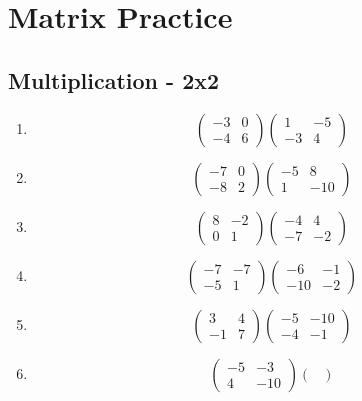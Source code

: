 \documentclass{article}%
\begin{document}
%
\normalsize%
\section{Matrix Practice}%
\subsection{Multiplication {-} 2x2}%
\begin{enumerate}[label=\arabic*)]%
\item%
\[%
\begin{pmatrix}%
-3&0\\%
-4&6%
\end{pmatrix} \begin{pmatrix}%
1&-5\\%
-3&4%
\end{pmatrix}%
\]%
\item%
\[%
\begin{pmatrix}%
-7&0\\%
-8&2%
\end{pmatrix} \begin{pmatrix}%
-5&8\\%
1&-10%
\end{pmatrix}%
\]%
\item%
\[%
\begin{pmatrix}%
8&-2\\%
0&1%
\end{pmatrix} \begin{pmatrix}%
-4&4\\%
-7&-2%
\end{pmatrix}%
\]%
\item%
\[%
\begin{pmatrix}%
-7&-7\\%
-5&1%
\end{pmatrix} \begin{pmatrix}%
-6&-1\\%
-10&-2%
\end{pmatrix}%
\]%
\item%
\[%
\begin{pmatrix}%
3&4\\%
-1&7%
\end{pmatrix} \begin{pmatrix}%
-5&-10\\%
-4&-1%
\end{pmatrix}%
\]%
\item%
\[%
\begin{pmatrix}%
-5&-3\\%
4&-10%
\end{pmatrix} \begin{pmatrix}%

\end{pmatrix}\]
\end{enumerate}
\end{document}
